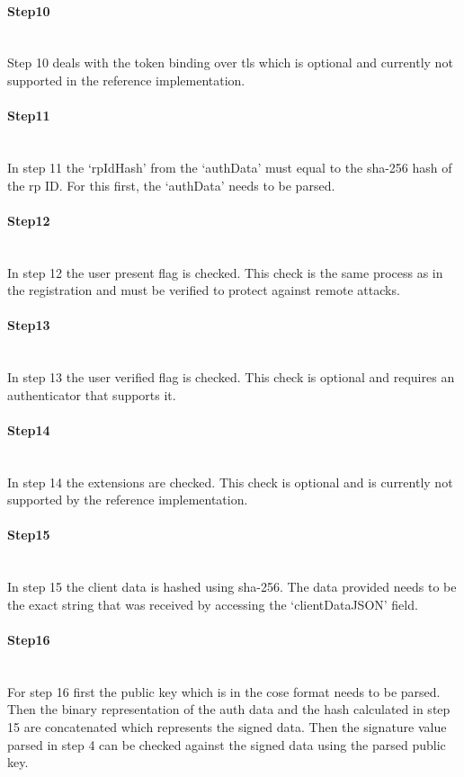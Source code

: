 \documentclass[a4paper, 11pt]{scrartcl}
\begin{document}
\paragraph{Step10}\hfill \\ 
Step 10 deals with the token binding over \gls{tls} which is optional and currently not supported in the reference implementation.

\paragraph{Step11}\hfill \\ 
In step 11 the `rpIdHash' from the `authData' must equal to the \gls{sha-256} hash of the \gls{rp} ID. For this first, the `authData' needs to be parsed. 

\paragraph{Step12}\hfill \\ 
In step 12 the user present flag is checked. This check is the same process as in the registration and must be verified to protect against remote attacks.

\paragraph{Step13}\hfill \\ 
In step 13 the user verified flag is checked. This check is optional and requires an authenticator that supports it. 

\paragraph{Step14}\hfill \\ 
In step 14 the extensions are checked. This check is optional and is currently not supported by the reference implementation.

\paragraph{Step15}\hfill \\ 
In step 15 the client data is hashed using \gls{sha-256}. The data provided needs to be the exact string that was received by accessing the `clientDataJSON' field.

\paragraph{Step16}\hfill \\ 
For step 16 first the public key which is in the \gls{cose} format needs to be parsed. Then the binary representation of the auth data and the hash calculated in step 15 are concatenated which represents the signed data. Then the signature value parsed in step 4 can be checked against the signed data using the parsed public key. 
\end{document}
